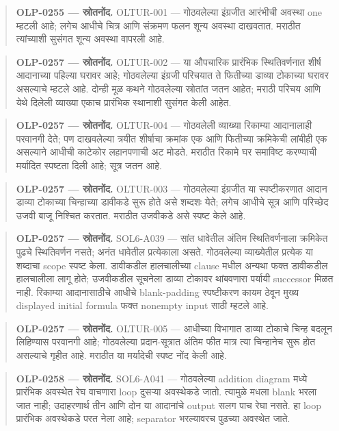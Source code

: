 \begin{quote}\small\textbf{OLP-0255 — स्रोतनोंद.} OLTUR-001 — गोठवलेल्या इंग्रजीत आरंभीची अवस्था one म्हटली आहे; लगेच आधीचे चित्र आणि संक्रमण फलन शून्य अवस्था दाखवतात. मराठीत त्यांच्याशी सुसंगत शून्य अवस्था वापरली आहे.\end{quote}
\begin{quote}\small\textbf{OLP-0257 — स्रोतनोंद.} OLTUR-002 — या औपचारिक प्रारंभिक स्थितिवर्णनात शीर्ष आदानाच्या पहिल्या घरावर आहे; गोठवलेल्या इंग्रजी परिचयात ते फितीच्या डाव्या टोकाच्या घरावर असल्याचे म्हटले आहे. दोन्ही मूळ कथने गोठवलेल्या स्रोतांत जतन आहेत; मराठी परिचय आणि येथे दिलेली व्याख्या एकाच प्रारंभिक स्थानाशी सुसंगत केली आहेत.\end{quote}
\begin{quote}\small\textbf{OLP-0257 — स्रोतनोंद.} OLTUR-004 — गोठवलेली व्याख्या रिकाम्या आदानालाही परवानगी देते; पण दाखवलेल्या त्रयीत शीर्षाचा क्रमांक एक आणि फितीच्या क्रमिकेची लांबीही एक असल्याने आधीची काटेकोर लहानपणाची अट मोडते. मराठीत रिकामे घर समाविष्ट करण्याची मर्यादित स्पष्टता दिली आहे; सूत्र जतन आहे.\end{quote}
\begin{quote}\small\textbf{OLP-0257 — स्रोतनोंद.} OLTUR-003 — गोठवलेल्या इंग्रजीत या स्पष्टीकरणात आदान डाव्या टोकाच्या चिन्हाच्या डावीकडे सुरू होते असे शब्दशः येते; लगेच आधीचे सूत्र आणि परिच्छेद उजवी बाजू निश्चित करतात. मराठीत उजवीकडे असे स्पष्ट केले आहे.\end{quote}
\begin{quote}\small\textbf{OLP-0257 — स्रोतनोंद.} SOL6-A039 — सांत धावेतील अंतिम स्थितिवर्णनाला क्रमिकेत पुढचे स्थितिवर्णन नसते; अनंत धावेतील प्रत्येकाला असते. गोठवलेल्या व्याख्येतील प्रत्येक या शब्दाचा scope स्पष्ट केला. डावीकडील हालचालीच्या clause मधील अन्यथा फक्त डावीकडील हालचालीला लागू होते; उजवीकडील सूचनेला डाव्या टोकावर थांबवणारा पर्यायी successor मिळत नाही. रिकाम्या आदानासाठीचे आधीचे blank-padding स्पष्टीकरण कायम ठेवून मुख्य displayed initial formula फक्त nonempty input साठी म्हटले आहे.\end{quote}
\begin{quote}\small\textbf{OLP-0257 — स्रोतनोंद.} OLTUR-005 — आधीच्या विभागात डाव्या टोकाचे चिन्ह बदलून लिहिण्यास परवानगी आहे; गोठवलेल्या प्रदान-सूत्रात अंतिम फीत मात्र त्या चिन्हानेच सुरू होत असल्याचे गृहीत आहे. मराठीत या मर्यादेची स्पष्ट नोंद केली आहे.\end{quote}
\begin{quote}\small\textbf{OLP-0258 — स्रोतनोंद.} SOL6-A041 — गोठवलेल्या addition diagram मध्ये प्रारंभिक अवस्थेत रेघ वाचणारा loop दुसऱ्या अवस्थेकडे जातो. त्यामुळे मधला blank भरला जात नाही; उदाहरणार्थ तीन आणि दोन या आदानांचे output सलग पाच रेघा नसते. हा loop प्रारंभिक अवस्थेकडे परत नेला आहे; separator भरल्यावरच पुढच्या अवस्थेत जाते.\end{quote}
